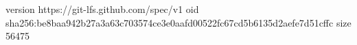 version https://git-lfs.github.com/spec/v1
oid sha256:be8baa942b27a3a63c703574ce3e0aafd00522fc67cd5b6135d2aefe7d51cffc
size 56475
